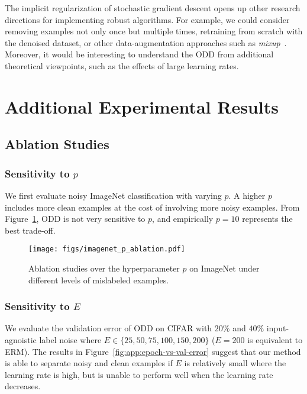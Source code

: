 \documentclass[a4paper,11pt]{article}
\begin{document}
The implicit regularization of stochastic gradient descent opens up other research directions for implementing robust algorithms. For example, we could consider removing examples not only once but multiple times, retraining from scratch with the denoised dataset, or other data-augmentation approaches such as \textit{mixup}~\cite{zhang2017mixup}. Moreover, it would be interesting to understand the \textsc{ODD} from additional theoretical viewpoints, such as the effects of large learning rates. 
\clearpage



\appendix
\newpage
\onecolumn
\appendix




\section{Additional Experimental Results}
\subsection{Ablation Studies}
\label{sec:exp-ablation}



\subsubsection{Sensitivity to $p$} We first evaluate noisy ImageNet classification with varying $p$. A higher $p$ includes more clean examples at the cost of involving more noisy examples. 
From Figure~\ref{fig:app:ablation-imagenet-p}, \textsc{ODD} is not very sensitive to $p$, and empirically $p = 10$ represents the best trade-off. \begin{figure}[h]
    \centering
    \texttt{[image: figs/imagenet\_p\_ablation.pdf]}
    \caption{Ablation studies over the hyperparameter $p$ on ImageNet under different levels of mislabeled examples.}
    \label{fig:app:ablation-imagenet-p}
\end{figure}



\subsubsection{Sensitivity to $E$} We evaluate the validation error of \textsc{ODD} on CIFAR with $20\%$ and $40\%$ input-agnoistic label noise where $E \in \{25, 50, 75, 100, 150, 200\}$ ($E = 200$ is equivalent to \textsc{ERM}). The results in Figure~\ref{fig:app:epoch-vs-val-error} suggest that our method is able to separate noisy and clean examples if $E$ is relatively small where the learning rate is high, but is unable to perform well when the learning rate decreases.
\end{document}
